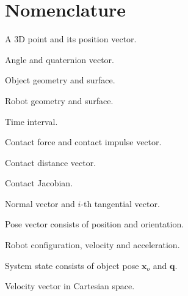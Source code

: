 \documentclass[journal]{IEEEtran}
\theoremstyle{definition}
\begin{document}
\section*{Nomenclature}
\begin{IEEEdescription}
\item[$p, \boldsymbol{p}$] A 3D point and its position vector.
\item[$\theta, \boldsymbol{\psi}$] Angle and quaternion vector.
\item[$\mathcal{O}, \partial \mathcal{O}$] Object geometry and surface.
\item[$\mathcal{R}, \partial \mathcal{R}$] Robot geometry and surface.

\item[$h$] Time interval.
\item[$\boldsymbol{\lambda}, \boldsymbol{\beta}$] Contact force and contact impulse vector.
\item[$\boldsymbol{\phi}$] Contact distance vector.
\item[$\boldsymbol{J}$] Contact Jacobian.
\item[$\boldsymbol{n}, \boldsymbol{t}_i$] Normal vector and $i$-th tangential vector.
\item[{$\boldsymbol{x} = [ \boldsymbol{p}, \boldsymbol{\psi} ]$}] Pose vector consists of position and orientation.
\item[$\boldsymbol{q}, \dot{\boldsymbol{q}}, \ddot{\boldsymbol{q}}$] Robot configuration, velocity and acceleration.
\item[$\boldsymbol{s}$] System state consists of object pose $\boldsymbol{x}_o$ and $\boldsymbol{q}$.
\item[$\boldsymbol{v}$] Velocity vector in Cartesian space.
\end{IEEEdescription}












\end{document}
